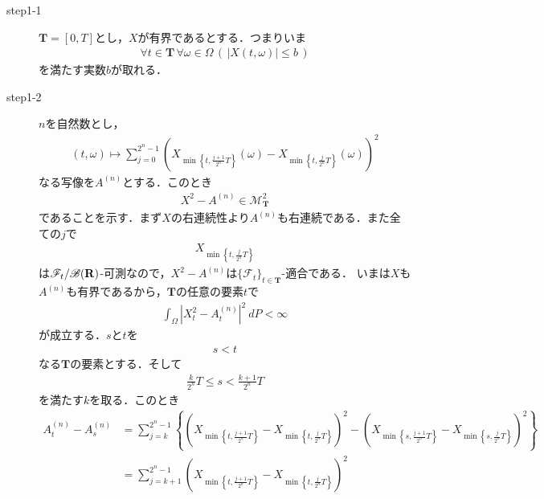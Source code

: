 	\begin{sketch}\mbox{}
		\begin{description}
			\item[step1-1] $\mathbf{T}=[0,T]$とし，$X$が有界であるとする．つまりいま
				\begin{align}
					\forall t \in \mathbf{T}\, \forall \omega \in \Omega\,
					\left(\, |X(t,\omega)| \leq b\, \right)
				\end{align}
				を満たす実数$b$が取れる．
			
			\item[step1-2] $n$を自然数とし，
				\begin{align}
					(t,\omega) \longmapsto \sum_{j=0}^{2^n-1} \left(X_{\min\left\{t,\frac{j+1}{2^n}T\right\}}(\omega)
					- X_{\min\left\{t,\frac{j}{2^n}T\right\}}(\omega)\right)^2
				\end{align}
				なる写像を$A^{(n)}$とする．このとき
				\begin{align}
					X^2 - A^{(n)} \in \mathscr{M}^2_{\mathbf{T}}
					\label{fom:thm_decomposition_of_square_integrable_martingales_2}
				\end{align}
				であることを示す．まず$X$の右連続性より$A^{(n)}$も右連続である．また全ての$j$で
				\begin{align}
					X_{\min\left\{t,\frac{j}{2^n}T\right\}}
				\end{align}
				は$\mathscr{F}_t/\mathscr{B}(\mathbf{R})$-可測なので，$X^2-A^{(n)}$は$\{\mathscr{F}_t\}_{t \in \mathbf{T}}$-適合である．
				いまは$X$も$A^{(n)}$も有界であるから，$\mathbf{T}$の任意の要素$t$で
				\begin{align}
					\int_{\Omega} \left|X_t^2-A_t^{(n)}\right|^2\ dP < \infty
				\end{align}
				が成立する．$s$と$t$を
				\begin{align}
					s < t
				\end{align}
				なる$\mathbf{T}$の要素とする．そして
				\begin{align}
					\frac{k}{2^n}T \leq s < \frac{k+1}{2^n}T
				\end{align}
				を満たす$k$を取る．このとき
				\begin{align}
					A^{(n)}_t - A^{(n)}_s
					&= \sum_{j=k}^{2^n-1} \left\{
					\left(X_{\min\left\{t,\frac{j+1}{2^n}T\right\}} - X_{\min\left\{t,\frac{j}{2^n}T\right\}}\right)^2
					- \left(X_{\min\left\{s,\frac{j+1}{2^n}T\right\}} - X_{\min\left\{s,\frac{j}{2^n}T\right\}}\right)^2\right\} \\
					&= \sum_{j=k+1}^{2^n-1} \left(X_{\min\left\{t,\frac{j+1}{2^n}T\right\}} - X_{\min\left\{t,\frac{j}{2^n}T\right\}}\right)^2

\end{align}
\end{description}
\end{sketch}
